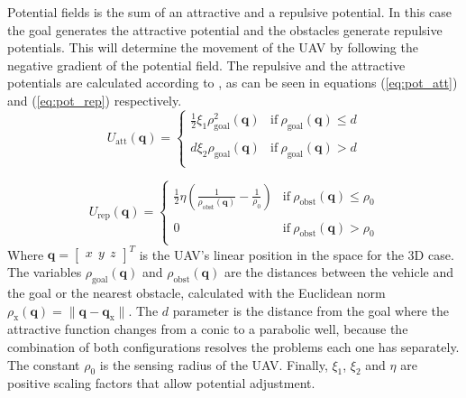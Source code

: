 \documentclass[journal]{IEEEtran}
\newcommand*{\subb}[1]{_{\mathrm{#1}}}
\begin{document}
		Potential fields is the sum of an attractive and a repulsive potential. In this case the goal generates the attractive potential and the obstacles generate repulsive potentials. This will determine the movement of the UAV by following the negative gradient of the potential field. The repulsive and the attractive potentials are calculated according to \cite{potfieldsmethod}, as can be seen in equations (\ref{eq:pot_att}) and (\ref{eq:pot_rep}) respectively.
 		\begin{equation} \label{eq:pot_att}
			U\subb{att}(\bm{q}) =  \left\lbrace  {\begin{array}{cc}
				\frac{1}{2} \xi\subb{1} \rho\subb{goal}^2(\bm{q})& \textrm{if} \ \rho\subb{goal}(\bm{q})\leq d \\
				\\
				d \xi\subb{2} \rho\subb{goal}(\bm{q}) &\textrm{if} \ \rho\subb{goal}(\bm{q})> d \\
				\end{array} } \right.
 		\end{equation}
 		
 		\begin{equation} \label{eq:pot_rep}
 		U\subb{rep}(\bm{q}) =  \left\lbrace  {\begin{array}{cc}
 			\frac{1}{2} \eta (\frac{1}{\rho\subb{obst}(\bm{q})} - \frac{1}{\rho\subb{0}}) &\textrm{if} \ \rho\subb{obst}(\bm{q})\leq \rho\subb{0} \\
 			\\
 			0 &\textrm{if} \ \rho\subb{obst}(\bm{q})> \rho\subb{0} \\
 			\end{array} } \right.
 		\end{equation}
	Where $\bm{q} = \left[ {\begin{array}{ccc} x \ \ y \ \ z \end{array} } \right]^T $ is the UAV's linear position in the space for the 3D case. The variables $\rho\subb{goal}(\bm{q})$ and $\rho\subb{obst}(\bm{q})$ are the distances between the vehicle and the goal or the nearest obstacle, calculated with the Euclidean norm $\rho\subb{x}(\bm{q}) = \parallel \bm{q} - \bm{q\subb{x}}\parallel$. The $d$ parameter is the distance from the goal where the attractive function changes from a conic to a parabolic well, because the combination of both configurations resolves the problems each one has separately. The constant $\rho\subb{0}$ is the sensing radius of the UAV. Finally, $\xi\subb{1}$, $\xi\subb{2}$ and $\eta$ are positive scaling factors that allow potential adjustment. \\
	
\end{document}
